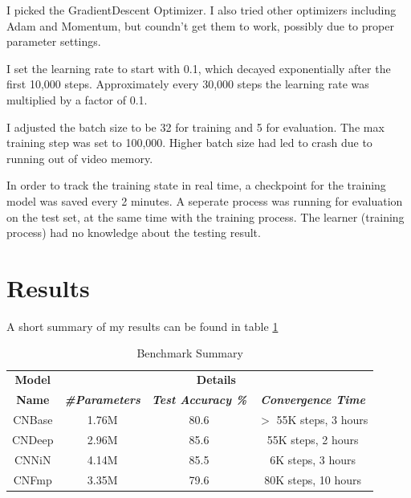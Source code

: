 \documentclass[conference]{IEEEtran}
\begin{document}
I picked the GradientDescent Optimizer. I also tried other optimizers including Adam and Momentum, but coundn't get them to work, possibly due to proper parameter settings.

I set the learning rate to start with 0.1, which decayed exponentially after the first 10,000 steps. Approximately every 30,000 steps the learning rate was multiplied by a factor of 0.1. 

I adjusted the batch size to be 32 for training and 5 for evaluation. The max training step was set to 100,000. Higher batch size had led to crash due to running out of video memory.

In order to track the training state in real time, a checkpoint for the training model was saved every 2 minutes. A seperate process was running for evaluation on the test set, at the same time with the training process. The learner (training process) had no knowledge about the testing result.

\section{Results}
A short summary of my results can be found in table \ref{tab1}

\begin{table}[htbp]
\caption{Benchmark Summary}
\begin{center}
\begin{tabular}{|c|c|c|c|}
\hline
\textbf{Model}&\multicolumn{3}{|c|}{\textbf{Details}} \\
\cline{2-4} 
\textbf{Name} & \textbf{\textit{\#Parameters}}& \textbf{\textit{Test Accuracy \%}}& \textbf{\textit{Convergence Time}} \\
\hline
CNBase &1.76M  & 80.6& $>$ 55K steps, 3 hours\\
\hline
CNDeep & 2.96M & 85.6 & 55K steps, 2 hours \\
\hline
CNNiN & 4.14M & 85.5& 6K steps, 3 hours \\
\hline
CNFmp & 3.35M & 79.6 & 80K steps, 10 hours \\
\hline

\end{tabular}
\label{tab1}
\end{center}
\end{table}
\end{document}
